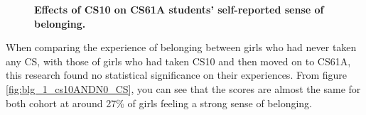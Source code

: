 \documentclass[oneside,titlepage,numbers=noenddot,headinclude,%
               footinclude=true,cleardoublepage=empty,abstractoff,BCOR=2mm,%
               paper=a4,fontsize=11pt,ngerman,american]{scrreprt}
\numberwithin{theorem}{chapter}
\numberwithin{definition}{chapter}
\numberwithin{algorithm}{chapter}
\numberwithin{figure}{chapter}
\numberwithin{table}{chapter}
\numberwithin{equation}{chapter}
\begin{document}
\begin{figure}[!htbp]
    \centering 
    \qquad
%

%
\caption{\textbf{Effects of CS10 on CS61A students' self-reported sense of belonging.}}
\label{fig:blg_1_cs10_cs61a}
\end{figure}

When comparing the experience of belonging between girls who had never taken any CS, with those of girls who had taken CS10 and then moved on to CS61A, this research found no statistical significance on their experiences. From figure \ref{fig:blg_1_cs10ANDN0_CS}, you can see that the scores are almost the same for both cohort at around 27\% of girls feeling a strong sense of belonging.
\end{document}

